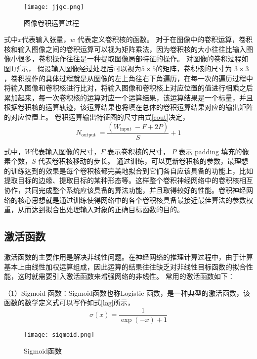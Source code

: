 \begin{figure}[htbp]
    \centering
    \texttt{[image: jjgc.png]}
    \caption{图像卷积运算过程}
    \label{jjgc}
\end{figure}

式中$x$代表输入张量，$w$ 代表定义卷积核的函数。
对于在图像中的卷积运算，卷积核和输入图像之间的卷积运算可以视为矩阵乘法，因为卷积核的大小往往比输入图像小很多，卷积操作往往是一种提取图像局部特征的操作。
对图像的卷积过程如图\ref{jjgc}所示，
假设输入图像经过处理后可以视为$5\times5$的矩阵，卷积核的尺寸为
$3\times3$，卷积操作的具体过程就是从图像的左上角往右下角遍历，在每一次的遍历过程中将输入图像和卷积核进行比对，将输入图像和卷积核上对应位置的值进行相乘之后累加起来，每一次卷积核的运算对应一个运算结果，该运算结果是一个标量，并且根据卷积核的运算轨迹，该运算结果也将填在总体的卷积运算结果对应的输出矩阵的对应位置上。
卷积运算输出特征图的尺寸由式\ref{cout}决定，
\begin{equation}
    N_{\text {output }}=\frac{\left(W_{\text {input }}-F+2 P\right)}{S}+1
    \label{cout}
\end{equation}

式中，$W$代表输入图像的尺寸，$F$ 表示卷积核的尺寸， $P$ 表示 padding 填充的像素个数，$S$ 代表卷积核移动的步长。
通过训练，可以更新卷积核的参数，最理想的训练达到的效果是每个卷积核都完美地拟合到它们各自应该具备的功能上，比如提取目标的边缘、提取目标的某种形态等。这样整个卷积神经网络中的卷积核相互协作，共同完成整个系统应该具备的算法功能，并且取得较好的性能。卷积神经网络的核心思想就是通过训练使得网络中的各个卷积核具备最接近最佳算法的参数权重，从而达到拟合出处理输入对象的正确目标函数的目的。

\subsection{激活函数}
激活函数的主要作用是解决非线性问题。在神经网络的推理计算过程中，由于计算基本上由线性加权运算组成，因此运算的结果往往缺乏对非线性目标函数的拟合性能，这时就需要引入激活函数来增强网络的非线性。
常用的激活函数如下：

（1）Sigmoid 函数：Sigmoid函数也称Logistic 函数，是一种典型的激活函数，该函数的数学定义式可以写作如式\ref{log}所示，
\begin{equation}
    \sigma(x)=\frac{1}{\exp (-x)+1}
    \label{log}
\end{equation}

\begin{figure}[htbp]
    \centering
    \texttt{[image: sigmoid.png]}
    \caption{Sigmoid函数}
    \label{sig}
\end{figure}

